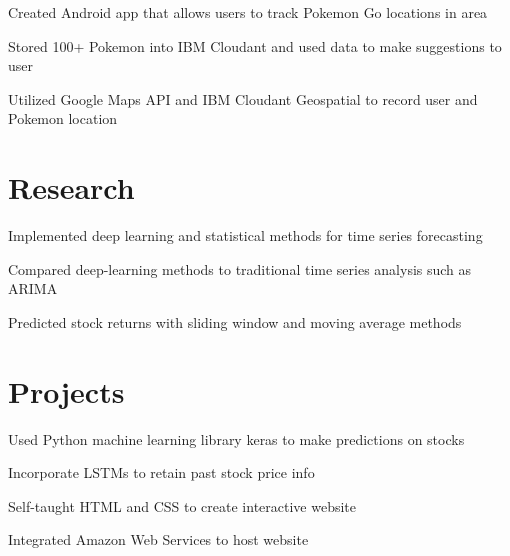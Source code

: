 \documentclass[]{deedy-resume-openfont}
\begin{document}
\begin{minipage}[t]{0.66\textwidth}
\begin{tightemize} 
\item Created Android app that allows users to track Pokemon Go locations in area 
\item Stored 100+ Pokemon into IBM Cloudant and used data to make suggestions to user
\item  Utilized Google Maps API and IBM Cloudant Geospatial to record user and Pokemon location
\end{tightemize}
\sectionsep

\section{Research}
\begin{tightemize} 
\item Implemented deep learning and statistical methods for time series forecasting
\item Compared deep-learning methods to traditional time series analysis such as ARIMA
\item Predicted stock returns with sliding window and moving average methods
\end{tightemize}
\sectionsep


\section{Projects}
\location{}
\begin{tightemize} 
\item Used Python machine learning library keras to make predictions on stocks
\item Incorporate LSTMs to retain past stock price info
\end{tightemize}
\location{}
\begin{tightemize} 
\item Self-taught HTML and CSS to create interactive website
\item Integrated Amazon Web Services to host website
\end{tightemize}
\sectionsep


\end{minipage}
\end{document}
